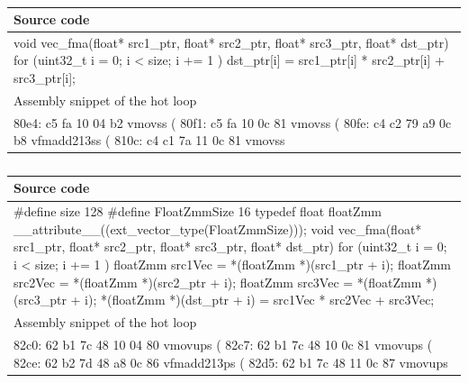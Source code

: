 \documentclass[logo,bsc,singlespacing,parskip]{infthesis}
\newenvironment{VerbatimCompact}
  {\vspace*{-2.5mm}\VerbatimEnvironment
   \par\Verbatim}
  {\endVerbatim\vspace*{-2.4mm}}
\begin{document}
\begin{table}[ht]\captionsetup{name=Listing}
\begin{tabular}{>{\raggedright\arraybackslash}p{14cm}}
    Source code\\
    \midrule
    \begin{VerbatimCompact}
void vec_fma(float* src1_ptr, float* src2_ptr,
             float* src3_ptr, float* dst_ptr) {
    for (uint32_t i = 0; i < size; i += 1 ){
        dst_ptr[i] = src1_ptr[i] * src2_ptr[i] + src3_ptr[i];
    }
}
    \end{VerbatimCompact}
    \\
    Assembly snippet of the hot loop\\
    \midrule
    \begin{VerbatimCompact}
80e4: c5 fa 10 04 b2     vmovss (%
80f1: c5 fa 10 0c 81     vmovss (%
80fe: c4 c2 79 a9 0c b8  vfmadd213ss (%
810c: c4 c1 7a 11 0c 81  vmovss %
    \end{VerbatimCompact}
    \\
\end{tabular}
\caption{}
\label{table:vec-fma-float-auto}
\end{table}

\begin{table}[H]\captionsetup{name=Listing}
\begin{tabular}{>{\raggedright\arraybackslash}p{14cm}}
    Source code\\
    \midrule
    \begin{VerbatimCompact}
#define size 128
#define FloatZmmSize 16
typedef float floatZmm __attribute__((ext_vector_type(FloatZmmSize)));
void vec_fma(float* src1_ptr, float* src2_ptr,
             float* src3_ptr, float* dst_ptr) {
    for (uint32_t i = 0; i < size; i += 1 ){
        floatZmm src1Vec = *(floatZmm *)(src1_ptr + i);
        floatZmm src2Vec = *(floatZmm *)(src2_ptr + i);
        floatZmm src3Vec = *(floatZmm *)(src3_ptr + i);
        *(floatZmm *)(dst_ptr + i) = src1Vec * src2Vec + src3Vec;
    }
}
    \end{VerbatimCompact}
    \\
    Assembly snippet of the hot loop\\
    \midrule
    \begin{VerbatimCompact}
82c0: 62 b1 7c 48 10 04 80   vmovups (%
82c7: 62 b1 7c 48 10 0c 81   vmovups (%
82ce: 62 b2 7d 48 a8 0c 86   vfmadd213ps (%
82d5: 62 b1 7c 48 11 0c 87   vmovups %
    \end{VerbatimCompact}
    \\
\end{tabular}
\caption{}
\label{table:vec-fma-float-vecty}
\end{table}
    
\end{document}
